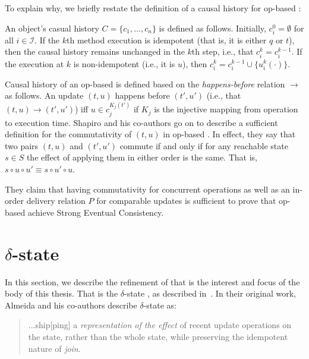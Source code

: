 To explain why, we briefly restate the definition of a causal history for
op-based \CRDTs:

\begin{definition}
An object's casual history $C = \{ c_1, \ldots, c_n \}$ is defined as follows.
Initially, $c_i^0 = \emptyset$ for all $i \in \mathcal{I}$. If the $k$th method
execution is idempotent (that is, it is either $q$ or $t$), then the causal
history remains unchanged in the $k$th step, i.e., that $c_i^k = c_i^{k-1}$. If
the execution at $k$ is non-idempotent (i.e., it is $u$), then $c_i^{k} =
c_i^{k-1} \cup \{ u_i^k(\cdot) \}$.
\end{definition}

Causal history of an op-based \CRDT is defined based on the
\textit{happens-before} relation $\to$ as follows. An update $(t,u)$ happens
before $(t',u')$ (i.e., that $(t, u) \to (t', u')$) iff $u \in c_{j}^{K_j(t')}$
if $K_j$ is the injective mapping from operation to execution time. Shapiro and
his co-authors go on to describe a sufficient definition for the commutativity
of $(t,u)$ in op-based \CRDTs. In effect, they say that two pairs $(t,u)$ and
$(t',u')$ commute if and only if for any reachable state $s \in S$ the effect of
applying them in either order is the same. That is, $s \circ u \circ u' \equiv s
\circ u' \circ u$.

They claim that having commutativity for concurrent operations as well as an
in-order delivery relation $P$ for comparable updates is sufficient to prove
that op-based \CRDTs achieve Strong Eventual Consistency.

\section{$\delta$-state \CRDTs}
In this section, we describe the refinement of \CRDTs that is the interest and
focus of the body of this thesis. That is the $\delta$-state \CRDT, as described
in~\citet{almedia18}. In their original work, Almeida and his co-authors
describe $\delta$-state \CRDTs as:
\begin{quote}
...ship[ping] a \textit{representation of the effect} of recent update operations
on the state, rather than the whole state, while preserving the idempotent
nature of \textit{join}.
\end{quote}

